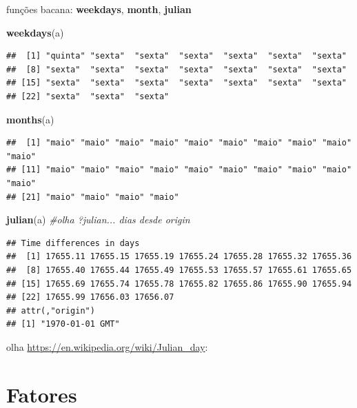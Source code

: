 \documentclass[]{book}
\newenvironment{Shaded}{\begin{snugshade}}{\end{snugshade}}
\newcommand{\KeywordTok}[1]{\textcolor[rgb]{0.13,0.29,0.53}{\textbf{#1}}}
\newcommand{\CommentTok}[1]{\textcolor[rgb]{0.56,0.35,0.01}{\textit{#1}}}
\newcommand{\NormalTok}[1]{#1}
\begin{document}
funções bacana: \textbf{weekdays}, \textbf{month}, \textbf{julian}

\begin{Shaded}
\begin{Highlighting}[]
\KeywordTok{weekdays}\NormalTok{(a)}
\end{Highlighting}
\end{Shaded}

\begin{verbatim}
##  [1] "quinta" "sexta"  "sexta"  "sexta"  "sexta"  "sexta"  "sexta" 
##  [8] "sexta"  "sexta"  "sexta"  "sexta"  "sexta"  "sexta"  "sexta" 
## [15] "sexta"  "sexta"  "sexta"  "sexta"  "sexta"  "sexta"  "sexta" 
## [22] "sexta"  "sexta"  "sexta"
\end{verbatim}

\begin{Shaded}
\begin{Highlighting}[]
\KeywordTok{months}\NormalTok{(a)}
\end{Highlighting}
\end{Shaded}

\begin{verbatim}
##  [1] "maio" "maio" "maio" "maio" "maio" "maio" "maio" "maio" "maio" "maio"
## [11] "maio" "maio" "maio" "maio" "maio" "maio" "maio" "maio" "maio" "maio"
## [21] "maio" "maio" "maio" "maio"
\end{verbatim}

\begin{Shaded}
\begin{Highlighting}[]
\KeywordTok{julian}\NormalTok{(a) }\CommentTok{#olha ?julian... dias desde origin}
\end{Highlighting}
\end{Shaded}

\begin{verbatim}
## Time differences in days
##  [1] 17655.11 17655.15 17655.19 17655.24 17655.28 17655.32 17655.36
##  [8] 17655.40 17655.44 17655.49 17655.53 17655.57 17655.61 17655.65
## [15] 17655.69 17655.74 17655.78 17655.82 17655.86 17655.90 17655.94
## [22] 17655.99 17656.03 17656.07
## attr(,"origin")
## [1] "1970-01-01 GMT"
\end{verbatim}

olha \url{https://en.wikipedia.org/wiki/Julian_day}:

\section{Fatores}\label{fatores}
\end{document}

